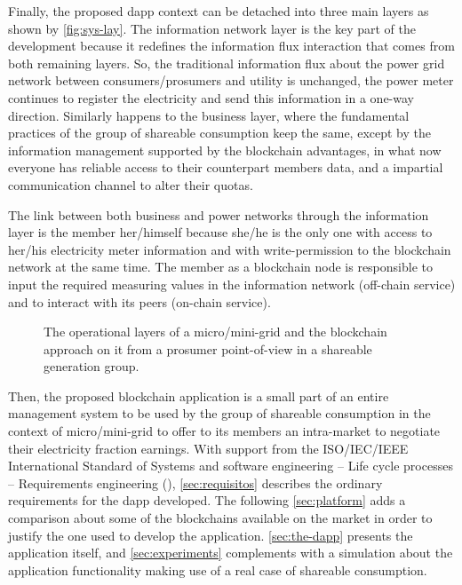 Finally, the proposed \gls{dapp} context can be detached into three main layers as shown by \autoref{fig:sys-lay}.
The information network layer is the key part of the development because it redefines the information flux interaction that comes from both remaining layers.
So, the traditional information flux about the power grid network between consumers/prosumers and utility is unchanged, the power meter continues to register the electricity and send this information in a one-way direction.
Similarly happens to the business layer, where the fundamental practices of the group of shareable consumption keep the same, except by the information management supported by the blockchain advantages,
in what now everyone has reliable access to their counterpart members data, and a impartial communication channel to alter their quotas.

The link between both business and power networks through the information layer is the member her/himself because she/he is the only one with access to her/his electricity meter information and with write-permission to the blockchain network at the same time.
The member as a blockchain node is responsible to input the required measuring values in the information network (off-chain service) and to interact with its peers (on-chain service).

\begin{figure}[htbp]{\textwidth}
    \centering
    \caption{The operational layers of a micro/mini-grid and the blockchain approach on it from a prosumer point-of-view in a shareable generation group.}
    \label{fig:sys-lay}
\end{figure}

Then, the proposed blockchain application is a small part of an entire management system to be used by the group of shareable consumption in the context of micro/mini-grid to offer to its members an intra-market to negotiate their electricity fraction earnings.
With support from the ISO/IEC/IEEE International Standard of Systems and software engineering -- Life cycle processes -- Requirements engineering (\citeyear{iso-iec-ieee}),
\autoref{sec:requisitos} describes the ordinary requirements for the \gls{dapp} developed.
The following \autoref{sec:platform} adds a comparison about some of the blockchains available on the market in order to justify the one used to develop the application.
\autoref{sec:the-dapp} presents the application itself,
and \autoref{sec:experiments} complements with a simulation about the application functionality making use of a real case of shareable consumption.

